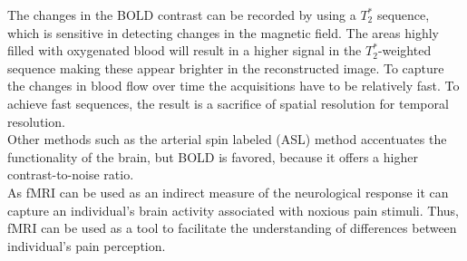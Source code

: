 The changes in the BOLD contrast can be recorded by using a $T_{2}^*$ sequence, which is sensitive in detecting changes in the magnetic field. The areas highly filled with oxygenated blood will result in a higher signal in the $T_{2}^*$-weighted sequence making these appear brighter in the reconstructed image. To capture the changes in blood flow over time the acquisitions have to be relatively fast. To achieve fast sequences, the result is a sacrifice of spatial resolution for temporal resolution. \cite{Khanna2015,Lee2002} \\ 
Other methods such as the arterial spin labeled (ASL) method accentuates the functionality of the brain, but BOLD is favored, because it offers a higher contrast-to-noise ratio. \cite{Lee2002} \\ As fMRI can be used as an indirect measure of the neurological response it can capture an individual’s brain activity associated with noxious pain stimuli. Thus, fMRI can be used as a tool to facilitate the understanding of differences between individual’s pain perception.  
